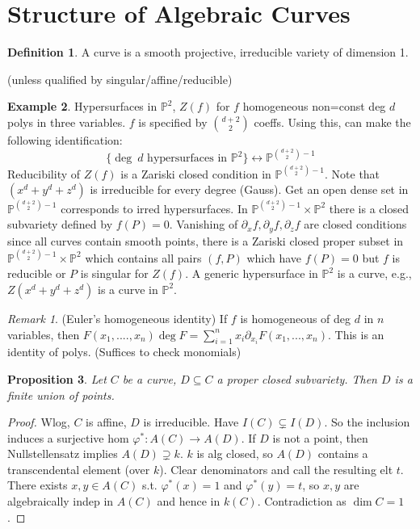 \documentclass{article}
\theoremstyle{definition}
\newtheorem{defn}{Definition}[section]
\newtheorem{example}[defn]{Example}
\theoremstyle{remark}
\newtheorem{rem}{Remark}
\theoremstyle{plain}
\newtheorem{prop}[defn]{Proposition}
\newcommand{\PP}{\mathbb{P}}
\begin{document}
\section{Structure of Algebraic Curves}
\begin{defn}
    A curve is a smooth projective, irreducible variety of dimension 1.
\end{defn}
(unless qualified by singular/affine/reducible)
\begin{example}
    Hypersurfaces in $\PP^2$, $Z(f)$ for $f$ homogeneous non=const deg $d$ polys in three variables. $f$ is specified by $\binom{d+2}{2}$ coeffs. Using this, can make the following identification:
    \[\{\deg\ d\text{ hypersurfaces in }\PP^2\}\leftrightarrow \PP^{\binom{d+2}{2}-1}\]
    Reducibility of $Z(f)$ is a Zariski closed condition in $\PP^{\binom{d+2}{2}-1}$. Note that $(x^d+y^d+z^d)$ is irreducible for every degree (Gauss). Get an open dense set in $\PP^{\binom{d+2}{2}-1}$ corresponds to irred hypersurfaces. In $\PP^{\binom{d+2}{2}-1}\times\PP^2$ there is a closed subvariety defined by $f(P)=0$. Vanishing of $\partial_xf,\partial_yf,\partial_zf$ are closed conditions since all curves contain smooth points, there is a Zariski closed proper subset in $\PP^{\binom{d+2}{2}-1}\times\PP^2$ which contains all pairs $(f,P)$ which have $f(P)=0$ but $f$ is reducible or $P$ is singular for $Z(f)$. A generic hypersurface in $\PP^2$ is a curve, e.g., $Z(x^d+y^d+z^d)$ is a curve in $\PP^2$.
\end{example}
\begin{rem}
    (Euler's homogeneous identity) If $f$ is homogeneous of deg $d$ in $n$ variables, then $F(x_1,....,x_n)\deg F=\sum_{i=1}^nx_i\partial_{x_i}F(x_1,...,x_n)$. This is an identity of polys. (Suffices to check monomials)
\end{rem}
\begin{prop}
    Let $C$ be a curve, $D\subseteq C$ a proper closed subvariety. Then $D$ is a finite union of points.
\end{prop}
\begin{proof}
    Wlog, $C$ is affine, $D$ is irreducible. Have $I(C)\subsetneq I(D)$. So the inclusion induces a surjective hom $\varphi^\ast:A(C)\to A(D)$. If $D$ is not a point, then Nullstellensatz implies $A(D)\supsetneq k$. $k$ is alg closed, so $A(D)$ contains a transcendental element (over $k$). Clear denominators and call the resulting elt $t$. There exists $x,y\in A(C)$ s.t. $\varphi^\ast(x)=1$ and $\varphi^\ast(y)=t$, so $x,y$ are algebraically indep in $A(C)$ and hence in $k(C)$. Contradiction as $\dim C=1$.
\end{proof}
\end{document}
